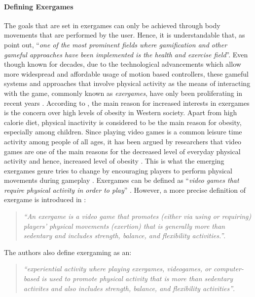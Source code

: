 \paragraph{Defining Exergames}
The goals that are set in exergames can only be achieved through body movements that are performed by the user. Hence, it is understandable that, as \cite{matallaoui2017effective} point out, ``\textit{one of the most prominent fields where
gamification and other gameful approaches have been
implemented is the health and exercise field}''. Even though known for decades, due to the technological advancements which allow more widespread and affordable usage of motion based controllers, these gameful systems and approaches that involve physical activity as the means of interacting with the game, commonly known as \textit{exergames}, have only been proliferating 
in recent years \cite{matallaoui2017effective}. 
According to \cite{kiili2010developing}, the main reason for increased interests in exergames is the concern over high levels of obesity in Western society. Apart from high calorie diet, physical inactivity is considered to be the main reason for obesity, especially among children. Since playing video games is a common leisure time activity among people of all ages, it has been argued by researchers \cite{kiili2010developing} that video games are one of the main reasons for the decreased level of everyday physical activity and hence, increased level of obesity \cite{vandewater2004linking}. This is what the emerging exergames genre tries to change by encouraging players to perform physical movements during gameplay \cite{kiili2010developing}. Exergames can be defined as ``\textit{video games that require physical activity in order to play}'' \cite{oh2010defining}. However, a more precise definition of exergame is introduced in \cite{oh2010defining}:
\begin{quotation}
\textit{``An exergame is a video
game that promotes (either via using or requiring) players’ physical movements (exertion) that is
generally more than sedentary and includes strength, balance, and flexibility activities.''}.
\end{quotation}
The authors \cite{oh2010defining} also define exergaming as an: 
\begin{quotation}
\textit{``experiential activity where playing exergames, videogames, or computer-based is used to promote physical activity that is more than sedentary activites and also includes strength, balance,
and flexibility activities''}.
\end{quotation}
